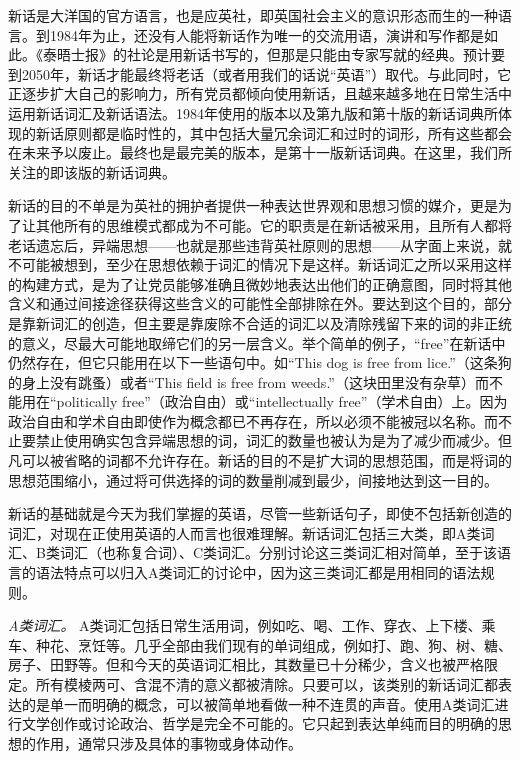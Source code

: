 新话是大洋国的官方语言，也是应英社，即英国社会主义的意识形态而生的一种语言。到1984年为止，还没有人能将新话作为唯一的交流用语，演讲和写作都是如此。《泰晤士报》的社论是用新话书写的，但那是只能由专家写就的经典。预计要到2050年，新话才能最终将老话（或者用我们的话说``英语''）取代。与此同时，它正逐步扩大自己的影响力，所有党员都倾向使用新话，且越来越多地在日常生活中运用新话词汇及新话语法。1984年使用的版本以及第九版和第十版的新话词典所体现的新话原则都是临时性的，其中包括大量冗余词汇和过时的词形，所有这些都会在未来予以废止。最终也是最完美的版本，是第十一版新话词典。在这里，我们所关注的即该版的新话词典。

新话的目的不单是为英社的拥护者提供一种表达世界观和思想习惯的媒介，更是为了让其他所有的思维模式都成为不可能。它的职责是在新话被采用，且所有人都将老话遗忘后，异端思想——也就是那些违背英社原则的思想——从字面上来说，就不可能被想到，至少在思想依赖于词汇的情况下是这样。新话词汇之所以采用这样的构建方式，是为了让党员能够准确且微妙地表达出他们的正确意图，同时将其他含义和通过间接途径获得这些含义的可能性全部排除在外。要达到这个目的，部分是靠新词汇的创造，但主要是靠废除不合适的词汇以及清除残留下来的词的非正统的意义，尽最大可能地取缔它们的另一层含义。举个简单的例子，``free''在新话中仍然存在，但它只能用在以下一些语句中。如``This
dog is free from lice.''（这条狗的身上没有跳蚤）或者``This field is free
from weeds.''（这块田里没有杂草）而不能用在``politically
free''（政治自由）或``intellectually
free''（学术自由）上。因为政治自由和学术自由即使作为概念都已不再存在，所以必须不能被冠以名称。而不止要禁止使用确实包含异端思想的词，词汇的数量也被认为是为了减少而减少。但凡可以被省略的词都不允许存在。新话的目的不是扩大词的思想范围，而是将词的思想范围缩小，通过将可供选择的词的数量削减到最少，间接地达到这一目的。

新话的基础就是今天为我们掌握的英语，尽管一些新话句子，即使不包括新创造的词汇，对现在正使用英语的人而言也很难理解。新话词汇包括三大类，即A类词汇、B类词汇（也称复合词）、C类词汇。分别讨论这三类词汇相对简单，至于该语言的语法特点可以归入A类词汇的讨论中，因为这三类词汇都是用相同的语法规则。

\sectionbreak

\emph{A类词汇。} A类词汇包括日常生活用词，例如吃、喝、工作、穿衣、上下楼、乘车、种花、烹饪等。几乎全部由我们现有的单词组成，例如打、跑、狗、树、糖、房子、田野等。但和今天的英语词汇相比，其数量已十分稀少，含义也被严格限定。所有模棱两可、含混不清的意义都被清除。只要可以，该类别的新话词汇都表达的是单一而明确的概念，可以被简单地看做一种不连贯的声音。使用A类词汇进行文学创作或讨论政治、哲学是完全不可能的。它只起到表达单纯而目的明确的思想的作用，通常只涉及具体的事物或身体动作。

